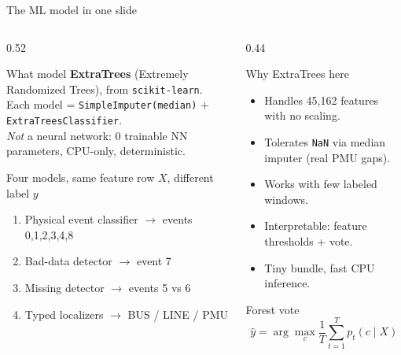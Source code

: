 \documentclass[aspectratio=169,10pt,t]{beamer}
\newcommand{\code}[1]{\texttt{\footnotesize #1}}
\begin{document}
\begin{frame}{The ML model in one slide}
\scriptsize
\begin{columns}[T,totalwidth=\textwidth]
\begin{column}{0.52\textwidth}
\begin{block}{What model}
\textbf{ExtraTrees} (Extremely Randomized Trees), from \code{scikit-learn}.\\[0.3mm]
Each model = \code{SimpleImputer(median)} $+$ \code{ExtraTreesClassifier}.\\[0.3mm]
\emph{Not} a neural network: 0 trainable NN parameters, CPU-only, deterministic.
\end{block}
\begin{exampleblock}{Four models, same feature row $X$, different label $y$}
\begin{enumerate}
\setlength{\itemsep}{0pt}
  \item Physical event classifier $\rightarrow$ events 0,1,2,3,4,8
  \item Bad-data detector $\rightarrow$ event 7
  \item Missing detector $\rightarrow$ events 5 vs 6
  \item Typed localizers $\rightarrow$ BUS / LINE / PMU
\end{enumerate}
\end{exampleblock}
\end{column}
\begin{column}{0.44\textwidth}
\begin{alertblock}{Why ExtraTrees here}
\begin{itemize}
  \item Handles 45{,}162 features with no scaling.
  \item Tolerates \code{NaN} via median imputer (real PMU gaps).
  \item Works with few labeled windows.
  \item Interpretable: feature thresholds + vote.
  \item Tiny bundle, fast CPU inference.
\end{itemize}
\end{alertblock}
\begin{block}{Forest vote}
\[
\hat{y}=\arg\max_{c}\frac{1}{T}\sum_{t=1}^{T}p_t(c\mid X)
\]
\end{block}
\end{column}
\end{columns}
\end{frame}
\end{document}
